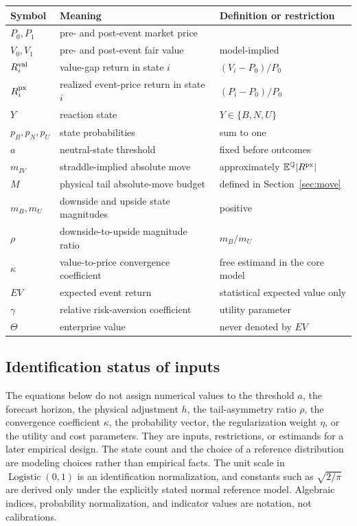 \begin{center}
\begin{tabular}{@{}lll@{}}
\toprule
Symbol & Meaning & Definition or restriction \\
\midrule
$P_0,P_1$ & pre- and post-event market price & \\
$V_0,V_1$ & pre- and post-event fair value & model-implied \\
$R^{\mathrm{val}}_i$ & value-gap return in state $i$ & $(V_i-P_0)/P_0$ \\
$R^{\mathrm{px}}_i$ & realized event-price return in state $i$ & $(P_i-P_0)/P_0$ \\
$Y$ & reaction state & $Y\in\{B,N,U\}$ \\
$p_B,p_N,p_U$ & state probabilities & sum to one \\
$a$ & neutral-state threshold & fixed before outcomes \\
$m_{IV}$ & straddle-implied absolute move & approximately $\mathbb{E}^{\mathbb Q}|R^{\mathrm{px}}|$ \\
$M$ & physical tail absolute-move budget & defined in Section~\ref{sec:move} \\
$m_B,m_U$ & downside and upside state magnitudes & positive \\
$\rho$ & downside-to-upside magnitude ratio & $m_B/m_U$ \\
$\kappa$ & value-to-price convergence coefficient & free estimand in the core model \\
$EV$ & expected event return & statistical expected value only \\
$\gamma$ & relative risk-aversion coefficient & utility parameter \\
$\Theta$ & enterprise value & never denoted by $EV$ \\
\bottomrule
\end{tabular}
\end{center}

\subsection{Identification status of inputs}

The equations below do not assign numerical values to the threshold $a$, the
forecast horizon, the physical adjustment $h$, the tail-asymmetry ratio $\rho$,
the convergence coefficient $\kappa$, the probability vector, the regularization
weight $\eta$, or the utility and cost parameters. They are inputs, restrictions,
or estimands for a later empirical design. The state count and the choice of a
reference distribution are modeling choices rather than empirical facts. The
unit scale in $\operatorname{Logistic}(0,1)$ is an identification normalization,
and constants such as $\sqrt{2/\pi}$ are derived only under the explicitly stated
normal reference model. Algebraic indices, probability normalization, and
indicator values are notation, not calibrations.

